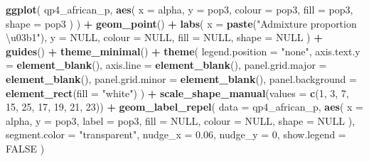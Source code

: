 \documentclass[
]{article}
\newenvironment{Shaded}{\begin{snugshade}}{\end{snugshade}}
\newcommand{\AttributeTok}[1]{\textcolor[rgb]{0.13,0.29,0.53}{#1}}
\newcommand{\ConstantTok}[1]{\textcolor[rgb]{0.56,0.35,0.01}{#1}}
\newcommand{\DecValTok}[1]{\textcolor[rgb]{0.00,0.00,0.81}{#1}}
\newcommand{\FloatTok}[1]{\textcolor[rgb]{0.00,0.00,0.81}{#1}}
\newcommand{\FunctionTok}[1]{\textcolor[rgb]{0.13,0.29,0.53}{\textbf{#1}}}
\newcommand{\NormalTok}[1]{#1}
\newcommand{\SpecialCharTok}[1]{\textcolor[rgb]{0.81,0.36,0.00}{\textbf{#1}}}
\newcommand{\StringTok}[1]{\textcolor[rgb]{0.31,0.60,0.02}{#1}}
\begin{document}
\begin{Shaded}
\begin{Highlighting}[]
\FunctionTok{ggplot}\NormalTok{(}
\NormalTok{  qp4\_african\_p,}
  \FunctionTok{aes}\NormalTok{(}
    \AttributeTok{x =}\NormalTok{ alpha, }\AttributeTok{y =}\NormalTok{ pop3, }\AttributeTok{colour =}\NormalTok{ pop3,}
    \AttributeTok{fill =}\NormalTok{ pop3, }\AttributeTok{shape =}\NormalTok{ pop3}
\NormalTok{  )}
\NormalTok{) }\SpecialCharTok{+}
  \FunctionTok{geom\_point}\NormalTok{() }\SpecialCharTok{+}
  \FunctionTok{labs}\NormalTok{(}
    \AttributeTok{x =} \FunctionTok{paste}\NormalTok{(}\StringTok{"Admixture proportion \textbackslash{}u03b1"}\NormalTok{), }\AttributeTok{y =} \ConstantTok{NULL}\NormalTok{,}
    \AttributeTok{colour =} \ConstantTok{NULL}\NormalTok{, }\AttributeTok{fill =} \ConstantTok{NULL}\NormalTok{, }\AttributeTok{shape =} \ConstantTok{NULL}
\NormalTok{  ) }\SpecialCharTok{+}
  \FunctionTok{guides}\NormalTok{() }\SpecialCharTok{+}
  \FunctionTok{theme\_minimal}\NormalTok{() }\SpecialCharTok{+}
  \FunctionTok{theme}\NormalTok{(}
    \AttributeTok{legend.position =} \StringTok{"none"}\NormalTok{,}
    \AttributeTok{axis.text.y =} \FunctionTok{element\_blank}\NormalTok{(),}
    \AttributeTok{axis.line =} \FunctionTok{element\_blank}\NormalTok{(),}
    \AttributeTok{panel.grid.major =} \FunctionTok{element\_blank}\NormalTok{(),}
    \AttributeTok{panel.grid.minor =} \FunctionTok{element\_blank}\NormalTok{(),}
    \AttributeTok{panel.background =} \FunctionTok{element\_rect}\NormalTok{(}\AttributeTok{fill =} \StringTok{"white"}\NormalTok{)}
\NormalTok{  ) }\SpecialCharTok{+}
  \FunctionTok{scale\_shape\_manual}\NormalTok{(}\AttributeTok{values =} \FunctionTok{c}\NormalTok{(}\DecValTok{1}\NormalTok{, }\DecValTok{3}\NormalTok{, }\DecValTok{7}\NormalTok{, }\DecValTok{15}\NormalTok{, }\DecValTok{25}\NormalTok{, }\DecValTok{17}\NormalTok{, }\DecValTok{19}\NormalTok{, }\DecValTok{21}\NormalTok{, }\DecValTok{23}\NormalTok{)) }\SpecialCharTok{+}
  \FunctionTok{geom\_label\_repel}\NormalTok{(}
    \AttributeTok{data =}\NormalTok{ qp4\_african\_p,}
    \FunctionTok{aes}\NormalTok{(}
      \AttributeTok{x =}\NormalTok{ alpha, }\AttributeTok{y =}\NormalTok{ pop3, }\AttributeTok{label =}\NormalTok{ pop3,}
      \AttributeTok{fill =} \ConstantTok{NULL}\NormalTok{, }\AttributeTok{colour =} \ConstantTok{NULL}\NormalTok{, }\AttributeTok{shape =} \ConstantTok{NULL}
\NormalTok{    ),}
    \AttributeTok{segment.color =} \StringTok{"transparent"}\NormalTok{, }\AttributeTok{nudge\_x =} \FloatTok{0.06}\NormalTok{,}
    \AttributeTok{nudge\_y =} \DecValTok{0}\NormalTok{, }\AttributeTok{show.legend =} \ConstantTok{FALSE}
\NormalTok{  )}
\end{Highlighting}
\end{Shaded}
\end{document}
